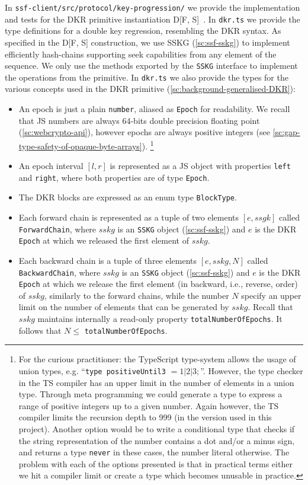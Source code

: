 In \texttt{ssf-client/src/protocol/key-progression/} we provide
the implementation and tests for the DKR primitive instantiation
D[F, S]~\cite{GKP}. In \texttt{dkr.ts} we provide the 
type definitions for a double key regression, resembling
the DKR syntax. As specified in the D[F, S] construction, we use
SSKG (\cref{sc:ssf-sskg}) to implement efficiently hash-chains supporting seek capabilities from any element of the sequence. 
We only use the methods exported by the
\texttt{SSKG} interface to implement the operations from the primitive. 
In \texttt{dkr.ts} we also provide the types for the various
concepts used in the DKR primitive (\cref{sc:background-generalised-DKR}):
\begin{itemize}
    \item An epoch is just a plain \texttt{number}, aliased as \texttt{Epoch} for readability. We recall that JS numbers are always 64-bits double precision floating point (\cref{sc:webcrypto-api}), however epochs are always positive integers (see \cref{sc:gap-type-safety-of-opaque-byte-arrays}).
    \footnote{For the curious practitioner: the TypeScript type-system allows the usage of union types, e.g. ``\texttt{type positiveUntil3} $ = 1 | 2 | 3; $''. However, the type checker in the TS compiler has an upper limit in the number of elements in a union type. Through meta programming we could generate a type to express a range of positive integers up to a given number. Again however, the TS compiler limits the recursion depth to 999 (in the version used in this project). Another option would be to write a conditional type that checks if the string representation of the number contains a dot and/or a minus sign, and returns a type \texttt{never} in these cases, the number literal otherwise. The problem with each of the options presented is that in practical terms either we hit a compiler limit or create a type which becomes unusable in practice.}
    \item An epoch interval $[l, r]$ is represented as a JS object with properties \texttt{left} and \texttt{right}, where both properties are of type \texttt{Epoch}.
    \item The DKR blocks are expressed as an enum type \texttt{BlockType}.
    \item Each forward chain is represented as a tuple of two elements $[e, ssgk]$ called \texttt{ForwardChain}, where $sskg$ is an \texttt{SSKG} object (\cref{sc:ssf-sskg}) and $e$ is the DKR \texttt{Epoch} at which we released the first element of $sskg$.
    \item Each backward chain is a tuple of three elements $[e, sskg, N]$ called \texttt{BackwardChain}, where $sskg$ is an \texttt{SSKG} object (\cref{sc:ssf-sskg}) and $e$ is the DKR \texttt{Epoch} at which we release the first element (in backward, i.e., reverse, order) of $sskg$, similarly to the forward chains, while the number $N$ specify an upper limit on the number of elements that can be generated by $sskg$. Recall that $sskg$ maintains internally a read-only property \texttt{totalNumberOfEpochs}. It follows that $N \leq$ \texttt{totalNumberOfEpochs}.

\end{itemize}
